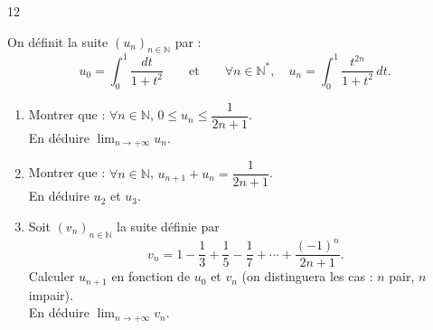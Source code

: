 \documentclass{axiobac}
\begin{document}
\begin{probleme}{12}

On définit la suite $(u_n)_{n \in \mathbb{N}}$ par :
\[
u_0 = \int_0^1 \frac{dt}{1 + t^2} \qquad \text{et} \qquad \forall n \in \mathbb{N}^*, \quad u_n = \int_0^1 \frac{t^{2n}}{1 + t^2} \, dt .
\]

\begin{enumerate}
    \item Montrer que : $\forall n \in \mathbb{N}$, $0 \leqslant u_n \leqslant \dfrac{1}{2n + 1}$. \\
    En déduire $\displaystyle\lim_{n \to +\infty} u_n$.
    \item Montrer que : $\forall n \in \mathbb{N}$, $u_{n+1} + u_n = \dfrac{1}{2n + 1}$. \\
    En déduire $u_2$ et $u_3$.
    \item Soit $(v_n)_{n \in \mathbb{N}}$ la suite définie par
    \[
    v_n = 1 - \frac{1}{3} + \frac{1}{5} - \frac{1}{7} + \cdots + \frac{(-1)^n}{2n + 1} .
    \]
    Calculer $u_{n+1}$ en fonction de $u_0$ et $v_n$ (on distinguera les cas : $n$ pair, $n$ impair). \\
    En déduire $\displaystyle\lim_{n \to +\infty} v_n$.
\end{enumerate}

\end{probleme}
\end{document}
